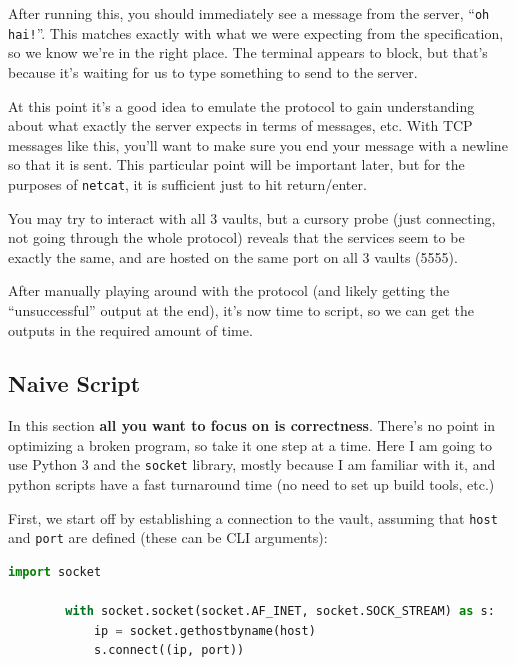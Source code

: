 \documentclass[11pt]{article}
\begin{document}
    After running this, you should immediately see a message from the server, ``\verb`oh hai!`''. This matches exactly with what we were expecting from the specification, so we know we're in the right place. The terminal appears to block, but that's because it's waiting for us to type something to send to the server.

    At this point it's a good idea to emulate the protocol to gain understanding about what exactly the server expects in terms of messages, etc. With TCP messages like this, you'll want to make sure you end your message with a newline so that it is sent. This particular point will be important later, but for the purposes of \verb`netcat`, it is sufficient just to hit return/enter.

    You may try to interact with all 3 vaults, but a cursory probe (just connecting, not going through the whole protocol) reveals that the services seem to be exactly the same, and are hosted on the same port on all 3 vaults (5555).

    \bigskip

    After manually playing around with the protocol (and likely getting the ``unsuccessful'' output at the end), it's now time to script, so we can get the outputs in the required amount of time.

    \subsection{Naive Script}\label{subsec:naive-script}

    In this section \textbf{all you want to focus on is correctness}. There's no point in optimizing a broken program, so take it one step at a time. Here I am going to use Python 3 and the \verb`socket` library, mostly because I am familiar with it, and python scripts have a fast turnaround time (no need to set up build tools, etc.)

    First, we start off by establishing a connection to the vault, assuming that \verb`host` and \verb`port` are defined (these can be CLI arguments):

    \begin{lstlisting}[gobble=8,label={lst:script-establish},language=Python]
        import socket

        with socket.socket(socket.AF_INET, socket.SOCK_STREAM) as s:
            ip = socket.gethostbyname(host)
            s.connect((ip, port))
    \end{lstlisting}
\end{document}
